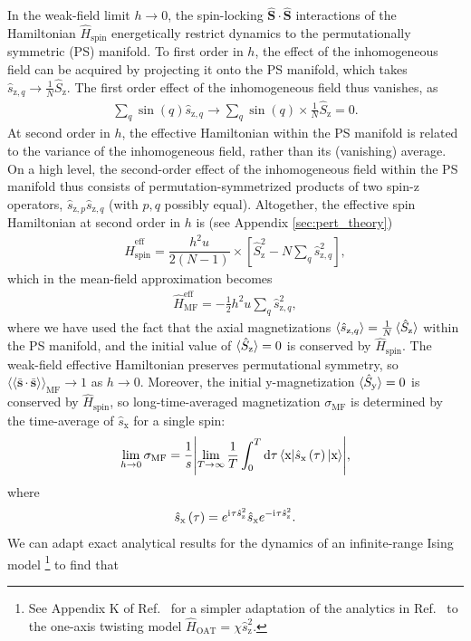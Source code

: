 \documentclass[aps,pra,nofootinbib,twocolumn,superscriptaddress]{revtex4-2}
\renewcommand{\t}{\text} %
\newcommand{\f}[2]{\dfrac{#1}{#2}} %
\newcommand{\p}[1]{\left(#1\right)} %
\renewcommand{\sp}[1]{\left[#1\right]} %
\newcommand{\bk}{\braket} %
\renewcommand{\v}{\bm} %
\renewcommand{\dd}{\text{d}} %
\renewcommand{\i}{\mathrm{i}\mkern1mu} %
\newcommand{\bbk}[1]{\langle\!\langle #1 \rangle\!\rangle}
\newcommand{\1}{\mathds{1}}
\newcommand{\s}{\hat s}
\renewcommand{\H}{\hat H}
\renewcommand{\S}{\hat S}
\newcommand{\x}{\text{x}}
\newcommand{\y}{\text{y}}
\newcommand{\z}{\text{z}}
\newcommand{\spin}{\text{spin}}
\newcommand{\eff}{\text{eff}}
\newcommand{\MF}{\text{MF}}
\renewcommand{\ss}{\bar{\v s}\cdot\bar{\v s}}
\begin{document}
In the weak-field limit $h\to0$, the spin-locking $\v\S\cdot\v\S$ interactions of the Hamiltonian $\H_\spin$ energetically restrict dynamics to the permutationally symmetric (PS) manifold.
To first order in $h$, the effect of the inhomogeneous field can be acquired by projecting it onto the PS manifold, which takes $\s_{\z,q}\to\frac1N\S_\z$.
The first order effect of the inhomogeneous field thus vanishes, as
\begin{align}
  \sum_q \sin\p{q} \s_{\z,q}
  \to \sum_q \sin\p{q} \times \frac1N \S_\z
  = 0.
\end{align}
At second order in $h$, the effective Hamiltonian within the PS manifold is related to the variance of the inhomogeneous field, rather than its (vanishing) average.
On a high level, the second-order effect of the inhomogeneous field within the PS manifold thus consists of permutation-symmetrized products of two spin-z operators, $\s_{\z,p}\s_{\z,q}$ (with $p,q$ possibly equal).
Altogether, the effective spin Hamiltonian at second order in $h$ is (see Appendix \ref{sec:pert_theory})
\begin{align}
  \H_\spin^\eff
  = \f{h^2 u}{2(N-1)} \times \sp{\S_\z^2 - N\sum_q \s_{\z,q}^2},
  \label{eq:H_spin_eff}
\end{align}
which in the mean-field approximation becomes
\begin{align}
  \H_\MF^\eff = -\frac12 h^2 u \sum_q \s_{\z,q}^2,
\end{align}
where we have used the fact that the axial magnetizations $\bk{\s_{\z,q}}=\frac1N\bk{\S_\z}$ within the PS manifold, and the initial value of $\bk{\S_\z}=0$ is conserved by $\H_\spin$.
The weak-field effective Hamiltonian preserves permutational symmetry, so $\bbk{\ss}_\MF\to1$ as $h\to0$.
Moreover, the initial y-magnetization $\bk{\S_\y}=0$ is conserved by $\H_\spin$, so long-time-averaged magnetization $\sigma_\MF$ is determined by the time-average of $\s_\x$ for a single spin:
\begin{align}
  \lim_{h\to0} \sigma_\MF
  = \f1s \abs{\lim_{T\to\infty} \f1T \int_0^T \dd\tau
  \bk{\x|\s_\x\p{\tau}|\x}},
\end{align}
where
\begin{align}
  \s_\x\p{\tau} = e^{\i\tau \s_\z^2} \s_\x e^{-\i\tau \s_\z^2}.
\end{align}
We can adapt exact analytical results for the dynamics of an infinite-range Ising model \cite{foss-feig2013nonequilibrium}\footnote{See Appendix K of Ref.~\cite{perlin2020shorttime} for a simpler adaptation of the analytics in Ref.~\cite{foss-feig2013nonequilibrium} to the one-axis twisting model $\H_{\t{OAT}}=\chi \s_\z^2$.} to find that
\end{document}
